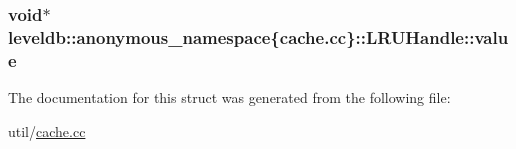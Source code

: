 \subsubsection[{value}]{\setlength{\rightskip}{0pt plus 5cm}void$\ast$ leveldb\+::anonymous\+\_\+namespace\{cache.\+cc\}\+::L\+R\+U\+Handle\+::value}\label{structleveldb_1_1anonymous__namespace_02cache_8cc_03_1_1_l_r_u_handle_aafc92b461c4b11883c567bc0edbfb661}


The documentation for this struct was generated from the following file\+:\begin{DoxyCompactItemize}
\item 
util/\hyperlink{cache_8cc}{cache.\+cc}\end{DoxyCompactItemize}
